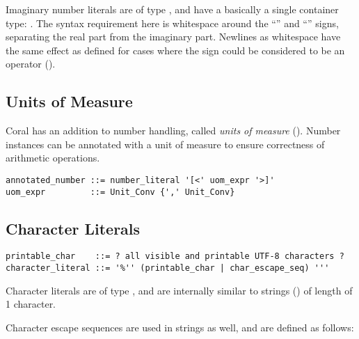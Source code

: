 Imaginary number literals are of type , and have a basically a single container type: . The syntax requirement here is whitespace around the ``\code{+}'' and ``\code{+}'' signs, separating the real part from the imaginary part. Newlines as whitespace have the same effect as defined for cases where the sign could be considered to be an operator (). 





\subsection{Units of Measure}
\label{sec:unitsofmeasuresyntax}

Coral has an addition to number handling, called {\em units of measure} (). Number instances can be annotated with a unit of measure to ensure correctness of arithmetic operations. 

\syntax\begin{lstlisting}
annotated_number ::= number_literal '[<' uom_expr '>]'
uom_expr         ::= Unit_Conv {',' Unit_Conv}
\end{lstlisting}






\subsection{Character Literals}
\label{sec:characterliterals}

\syntax\begin{lstlisting}
printable_char    ::= ? all visible and printable UTF-8 characters ? 
character_literal ::= '%'' (printable_char | char_escape_seq) '''
\end{lstlisting}

Character literals are of type , and are internally similar to strings () of length of 1 character. 

Character escape sequences are used in strings as well, and are defined as follows: 

